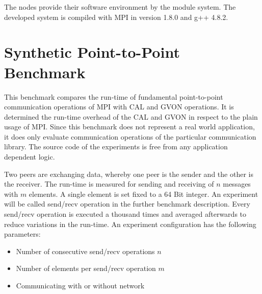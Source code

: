 

The nodes provide their software environment by the module system.
The developed system is compiled with MPI in version 1.8.0 and
g++ 4.8.2.  


\section{Synthetic Point-to-Point Benchmark}
This benchmark compares the run-time of fundamental
point-to-point communication operations of MPI with CAL and GVON
operations. It is determined the run-time overhead of the CAL and GVON
in respect to the plain usage of MPI. Since this benchmark does not
represent a real world application, it does only evaluate communication
operations of the particular communication library. The source code of
the experiments is free from any application dependent logic.

Two peers are exchanging data, whereby one peer is the sender and the
other is the receiver. The run-time is measured for sending and
receiving of $n$ messages with $m$ elements.  A single element is set
fixed to a 64 Bit integer.  An experiment will be called send/recv
operation in the further benchmark description. Every send/recv
operation is executed a thousand times and averaged afterwards to reduce
variations in the run-time. An experiment configuration has the
following parameters:

\begin{itemize}
  \item Number of consecutive send/recv operations $n$
  \item Number of elements per send/recv operation $m$
  \item Communicating with or without network
\end{itemize}

